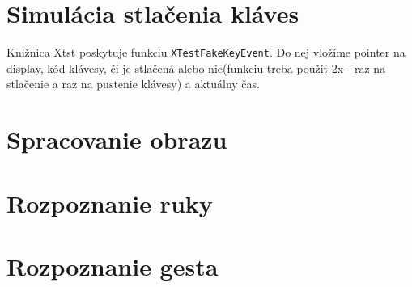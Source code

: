 \section{Simulácia stlačenia kláves}
Knižnica Xtst poskytuje funkciu {\tt XTestFakeKeyEvent}. Do nej vložíme pointer na display, kód klávesy, či je stlačená alebo nie(funkciu treba použiť 2x - raz na stlačenie a raz na pustenie klávesy) a aktuálny čas.

\section{Spracovanie obrazu}


\section{Rozpoznanie ruky}

\section{Rozpoznanie gesta}
